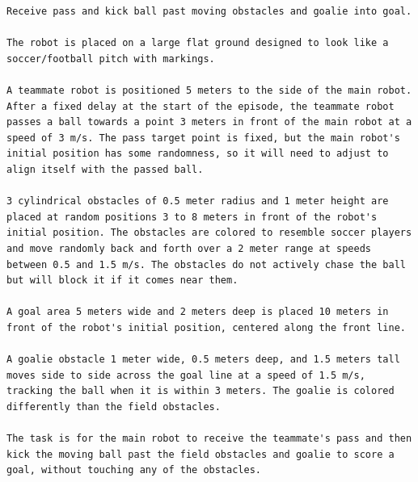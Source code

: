 \begin{lstlisting}[language={}]
Receive pass and kick ball past moving obstacles and goalie into goal.

The robot is placed on a large flat ground designed to look like a soccer/football pitch with markings. 

A teammate robot is positioned 5 meters to the side of the main robot. After a fixed delay at the start of the episode, the teammate robot passes a ball towards a point 3 meters in front of the main robot at a speed of 3 m/s. The pass target point is fixed, but the main robot's initial position has some randomness, so it will need to adjust to align itself with the passed ball.

3 cylindrical obstacles of 0.5 meter radius and 1 meter height are placed at random positions 3 to 8 meters in front of the robot's initial position. The obstacles are colored to resemble soccer players and move randomly back and forth over a 2 meter range at speeds between 0.5 and 1.5 m/s. The obstacles do not actively chase the ball but will block it if it comes near them.

A goal area 5 meters wide and 2 meters deep is placed 10 meters in front of the robot's initial position, centered along the front line. 

A goalie obstacle 1 meter wide, 0.5 meters deep, and 1.5 meters tall moves side to side across the goal line at a speed of 1.5 m/s, tracking the ball when it is within 3 meters. The goalie is colored differently than the field obstacles.

The task is for the main robot to receive the teammate's pass and then kick the moving ball past the field obstacles and goalie to score a goal, without touching any of the obstacles.
\end{lstlisting}
